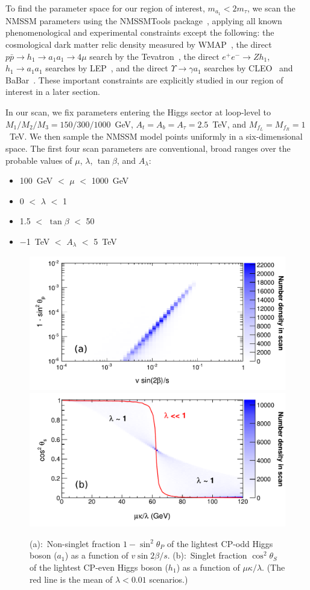 \documentclass[aps,prl,twocolumn,nofootinbib,superscriptaddress]{revtex4}
\begin{document}
To find the parameter space for our region of interest, $m_{a_1} <
2m_\tau$, we scan the NMSSM parameters using the NMSSMTools
package~\cite{nmssmtools1,nmssmtools2,nmssmtools3}, applying all known
phenomenological and experimental constraints except the following:
the cosmological dark matter relic density measured by
WMAP~\cite{wmap}, the direct $p\bar{p} \to h_1 \to a_1 a_1 \to 4\mu$
search by the Tevatron~\cite{Abazov:2009yi}, the direct $e^+e^- \to Z
h_1$, $h_1 \to a_1 a_1$ searches by
LEP~\cite{lep1exclusion,lep2exclusion}, and the direct $\Upsilon \to
\gamma a_1$ searches by CLEO~\cite{:2008hs} and
BaBar~\cite{Aubert:2009cp}.  These important constraints are
explicitly studied in our region of interest in a later section.

In our scan, we fix parameters entering the Higgs sector at loop-level
to $M_1/M_2/M_3 = 150/300/1000$~GeV, $A_t = A_b = A_\tau = 2.5$~TeV,
and $M_{f_L} = M_{f_R} =1$~TeV.  We then sample the NMSSM model points
uniformly in a six-dimensional space.  The first four scan parameters
are conventional, broad ranges over the probable values of $\mu$,
$\lambda$, $\tan\beta$, and $A_\lambda$:
\begin{itemize}
\item 100~GeV $<$ $\mu$ $<$ 1000~GeV
\item 0 $<$ $\lambda$ $<$ 1
\item 1.5 $<$ $\tan\beta$ $<$ 50
\item $-$1~TeV $<$ $A_\lambda$ $<$ 5~TeV
\end{itemize}

\begin{figure}[htb]
\includegraphics[width=0.49\linewidth]{plots/pcomp12_limit}
\hfill
\includegraphics[width=0.49\linewidth]{plots/scomp13_vs_mkoverl}

\caption{(a):~Non-singlet fraction $1-\sin^2{\theta_P}$ of the
  lightest CP-odd Higgs boson ($a_1$) as a function of $v\sin
  2\beta/s$.  (b):~Singlet fraction $\cos^2{\theta_S}$ of the lightest
  CP-even Higgs boson ($h_1$) as a function of $\mu\kappa/\lambda$.
  (The red line is the mean of $\lambda < 0.01$ scenarios.)
\label{fig:nonsingletcp1}}
\end{figure}
\end{document}
